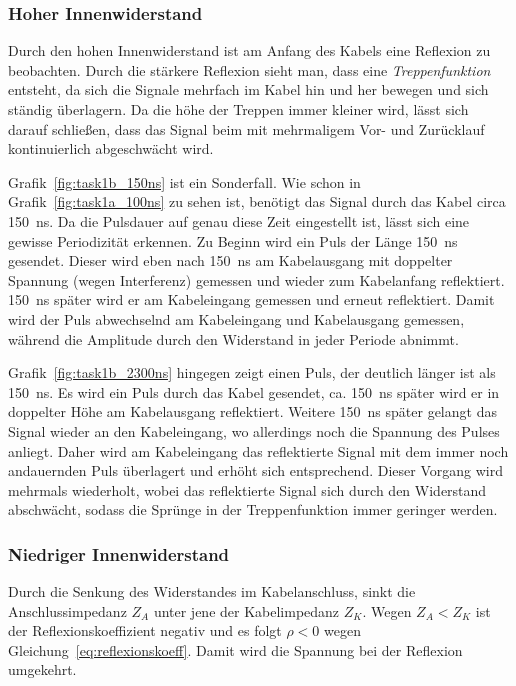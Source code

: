 \documentclass{article}
\begin{document}
\subsubsection{Hoher Innenwiderstand}

Durch den hohen Innenwiderstand ist am Anfang des Kabels eine Reflexion zu beobachten. Durch die stärkere Reflexion sieht man, dass eine \textit{Treppenfunktion} entsteht, da sich die Signale mehrfach im Kabel hin und her bewegen und sich ständig überlagern. Da die höhe der Treppen immer kleiner wird, lässt sich darauf schließen, dass das Signal beim mit mehrmaligem Vor- und Zurücklauf kontinuierlich abgeschwächt wird.

Grafik~\ref{fig:task1b_150ns} ist ein Sonderfall. Wie schon in Grafik~\ref{fig:task1a_100ns} zu sehen ist, benötigt das Signal durch das Kabel circa 150~ns. Da die Pulsdauer auf genau diese Zeit eingestellt ist, lässt sich eine gewisse Periodizität erkennen. Zu Beginn wird ein Puls der Länge 150~ns gesendet. Dieser wird eben nach 150~ns am Kabelausgang mit doppelter Spannung (wegen Interferenz) gemessen und wieder zum Kabelanfang reflektiert. 150~ns später wird er am Kabeleingang gemessen und erneut reflektiert. Damit wird der Puls abwechselnd am Kabeleingang und Kabelausgang gemessen, während die Amplitude durch den Widerstand in jeder Periode abnimmt.

Grafik~\ref{fig:task1b_2300ns} hingegen zeigt einen Puls, der deutlich länger ist als 150~ns. Es wird ein Puls durch das Kabel gesendet, ca. 150~ns später wird er in doppelter Höhe am Kabelausgang reflektiert. Weitere 150~ns später gelangt das Signal wieder an den Kabeleingang, wo allerdings noch die Spannung des Pulses anliegt. Daher wird am Kabeleingang das reflektierte Signal mit dem immer noch andauernden Puls überlagert und erhöht sich entsprechend. Dieser Vorgang wird mehrmals wiederholt, wobei das reflektierte Signal sich durch den Widerstand abschwächt, sodass die Sprünge in der Treppenfunktion immer geringer werden. 


\subsubsection{Niedriger Innenwiderstand}

Durch die Senkung des Widerstandes im Kabelanschluss, sinkt die Anschlussimpedanz $Z_A$ unter jene der Kabelimpedanz $Z_K$. Wegen $Z_A < Z_K$ ist der Reflexionskoeffizient negativ und es folgt $\rho < 0$ wegen Gleichung~\eqref{eq:reflexionskoeff}. Damit wird die Spannung bei der Reflexion umgekehrt.
\end{document}
